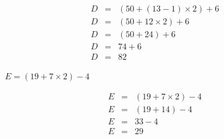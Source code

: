 \begin{questions}
	{\LARGE \begin{solution}
		\begin{eqnarray*}
		D &=&  (50 + (13 - 1) \times 2) + 6\\
		D &=&  (50 + 12 \times 2) + 6\\
		D &=& (50 + 24) + 6\\
		D &=& 74 + 6 \\
		D &=& 82 
		\end{eqnarray*}
	\end{solution}}
	
	
	{\LARGE \question[2]  $E = (19 + 7 \times 2) - 4$}
	
	{\LARGE \begin{solution}
		\begin{eqnarray*}
		E &=&  (19 + 7 \times 2) - 4\\
		E &=&  (19 + 14) - 4\\
		E &=& 33 - 4 \\
		E &=& 29 
		\end{eqnarray*}
	\end{solution}}
\end{questions}


